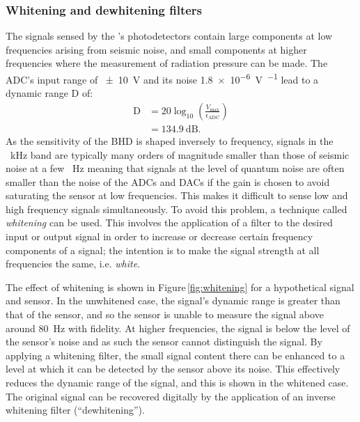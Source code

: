 \subsubsection{\label{sec:whitening-dewhitening}Whitening and dewhitening filters}
The signals sensed by the \SSMEXPT{}'s photodetectors contain large components at low frequencies arising from seismic noise, and small components at higher frequencies where the measurement of radiation pressure can be made. The \gls{ADC}'s input range of \SI{\pm10}{\volt} and its noise \SI{1.8e-6}{\volt\per\sqrthz} lead to a dynamic range $\text{D}$ of:
\begin{equation}
  \begin{split}
    \text{D} &= 20 \log_{10} \left( \frac{V_{\text{max}}}{\epsilon_{\text{ADC}}} \right) \\
             &= \SI{134.9}{\deci\bel}.
  \end{split}
\end{equation}
As the sensitivity of the \gls{BHD} is shaped inversely to frequency, signals in the \SI{}{\kilo\hertz} band are typically many orders of magnitude smaller than those of seismic noise at a few \SI{}{\hertz} meaning that signals at the level of quantum noise are often smaller than the noise of the \glspl{ADC} and \glspl{DAC} if the gain is chosen to avoid saturating the sensor at low frequencies. This makes it difficult to sense low and high frequency signals simultaneously. To avoid this problem, a technique called \emph{whitening} can be used. This involves the application of a filter to the desired input or output signal in order to increase or decrease certain frequency components of a signal; the intention is to make the signal strength at all frequencies the same, i.e. \emph{white}.

The effect of whitening is shown in Figure\,\ref{fig:whitening} for a hypothetical signal and sensor. In the unwhitened case, the signal's dynamic range is greater than that of the sensor, and so the sensor is unable to measure the signal above around \SI{80}{\hertz} with fidelity. At higher frequencies, the signal is below the level of the sensor's noise and as such the sensor cannot distinguish the signal. By applying a whitening filter, the small signal content there can be enhanced to a level at which it can be detected by the sensor above its noise. This effectively reduces the dynamic range of the signal, and this is shown in the whitened case. The original signal can be recovered digitally by the application of an inverse whitening filter (``dewhitening'').

